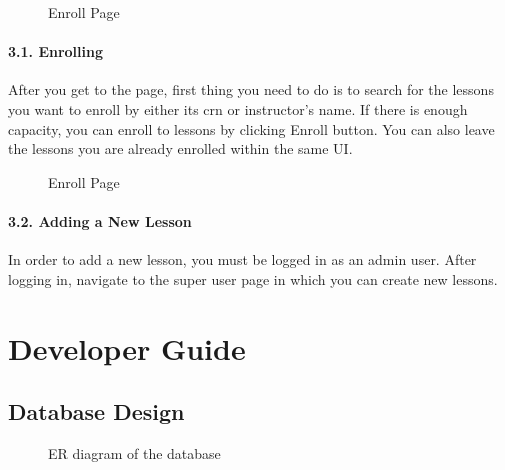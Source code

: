 \documentclass[letterpaper,10pt,english]{sphinxmanual}
\begin{document}
\begin{figure}[htbp]
\centering
\capstart

\noindent{}
\caption{Enroll Page}\label{\detokenize{user/mehmet:id5}}\end{figure}


\subsubsection{3.1. Enrolling}
\label{\detokenize{user/mehmet:enrolling}}
After you get to the  page, first thing you need to do is to search for the lessons you want to enroll by either its crn or instructor’s name. If there is enough capacity, you can enroll to lessons by clicking Enroll button. You can also leave the lessons you are already enrolled within the same UI.

\begin{figure}[htbp]
\centering
\capstart

\noindent{}
\caption{Enroll Page}\label{\detokenize{user/mehmet:id6}}\end{figure}


\subsubsection{3.2. Adding a New Lesson}
\label{\detokenize{user/mehmet:adding-a-new-lesson}}
In order to add a new lesson, you must be logged in as an admin user. After logging in, navigate to the super user page in which you can create new lessons.

\begin{figure}[htbp]
\centering

\noindent{}
\end{figure}


\chapter{Developer Guide}
\label{\detokenize{developer/index:developer-guide}}\label{\detokenize{developer/index::doc}}

\section{Database Design}
\label{\detokenize{developer/index:database-design}}
\begin{figure}[htbp]
\centering
\capstart

\noindent{}
\caption{ER diagram of the database}\label{\detokenize{developer/index:id1}}\end{figure}
\end{document}
